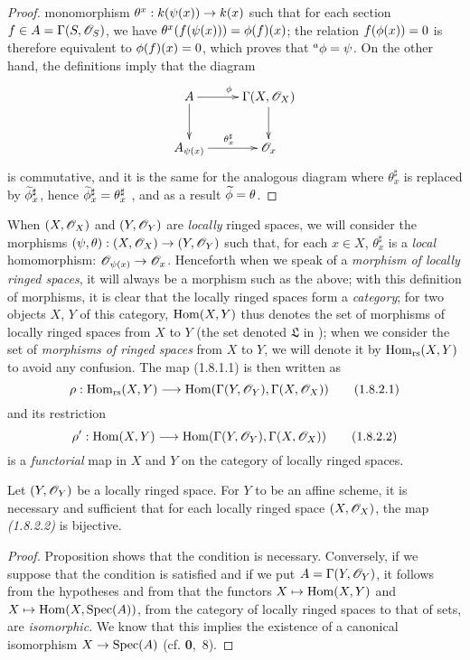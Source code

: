 \begin{proof}
monomorphism $\theta^x:k(\psi(x))\to k(x)$ such that for each section
$f\in A=\Gamma(S,\mathscr{O}_S)$, we have $\theta^x(f(\psi(x)))=\phi(f)(x)$; the relation
$f(\phi(x))=0$ is therefore equivalent to $\phi(f)(x)=0$, which proves that
${}^a\phi=\psi$. On the other hand, the definitions imply that the diagram
\[
  \xymatrix{
    A\ar[r]^\vphi\ar[d] &
    \Gamma(X,\OO_X)\ar[d]\\
    A_{\psi(x)}\ar[r]^{\theta_x^\sharp} &
    \OO_x
  }
\]
is commutative, and it is the same for the analogous diagram where $\theta_x^\sharp$ is
replaced by $\widetilde{\phi}_x^\sharp$, hence $\widetilde{\phi}_x^\sharp=\theta_x^\sharp$
, and as a result $\widetilde{\phi}=\theta$.
\end{proof}

\begin{env}[1.8.2]
\label{1.1.8.2}
When $(X,\mathscr{O}_X)$ and $(Y,\mathscr{O}_Y)$ are {\em locally} ringed spaces, we will consider the
morphisms $(\psi,\theta):(X,\mathscr{O}_X)\to(Y,\mathscr{O}_Y)$ such that, for each $x\in X$,
$\theta_x^\sharp$ is a {\em local} homomorphism: $\mathscr{O}_{\psi(x)}\to\mathscr{O}_x$. Henceforth when
we speak
of a {\em morphism of locally ringed spaces}, it will always be a morphism such as the
above; with this definition of morphisms, it is clear that the locally ringed spaces form a
{\em category}; for two objects $X$, $Y$ of this category, ${\mathop{\mathrm{Hom}}\nolimits}(X,Y)$ thus denotes the set
of morphisms of locally ringed spaces from $X$ to $Y$ (the set denoted $\mathfrak{L}$ in
); when we consider the set of {\em morphisms of ringed spaces} from $X$
to $Y$, we will denote it by ${\mathop{\mathrm{Hom}}\nolimits}_\text{rs}(X,Y)$ to avoid any confusion. The map (1.8.1.1)
is then written as
\[
  \rho:{\mathop{\mathrm{Hom}}\nolimits}_\text{rs}(X,Y)\longrightarrow{\mathop{\mathrm{Hom}}\nolimits}(\Gamma(Y,\mathscr{O}_Y),\Gamma(X,\mathscr{O}_X))
  \tag{1.8.2.1}
\]
and its restriction
\[
  \rho':{\mathop{\mathrm{Hom}}\nolimits}(X,Y)\longrightarrow{\mathop{\mathrm{Hom}}\nolimits}(\Gamma(Y,\mathscr{O}_Y),\Gamma(X,\mathscr{O}_X))
  \tag{1.8.2.2}
\]
is a {\em functorial} map in $X$ and $Y$ on the category of locally ringed spaces.
\end{env}

\begin{cor}[1.8.3]
\label{1.1.8.3}
Let $(Y,\mathscr{O}_Y)$ be a locally ringed space. For $Y$ to be an affine scheme, it is necessary
and sufficient that for each locally ringed space $(X,\mathscr{O}_X)$, the map {\em (1.8.2.2)} is
bijective.
\end{cor}

\begin{proof}
\label{proof-1.1.8.3}
Proposition  shows that the condition is necessary. Conversely, if we
suppose that the condition is satisfied and if we put $A=\Gamma(Y,\mathscr{O}_Y)$, it follows from
the hypotheses and from  that the functors $X\mapsto{\mathop{\mathrm{Hom}}\nolimits}(X,Y)$ and
$X\mapsto{\mathop{\mathrm{Hom}}\nolimits}(X,{\mathop{\mathrm{Spec}}\nolimits}(A))$, from the category of locally ringed spaces to that of sets, are
{\em isomorphic}. We know that this implies the existence of a canonical isomorphism
$X\to{\mathop{\mathrm{Spec}}\nolimits}(A)$ (cf. \textbf{0},~8).
\end{proof}

